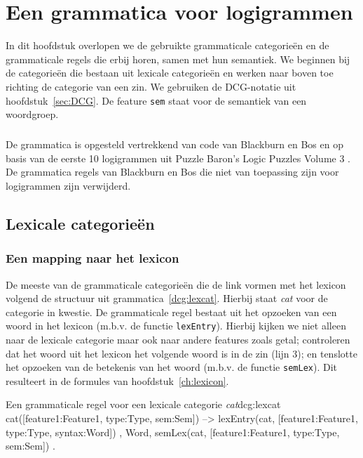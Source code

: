 \chapter{Een grammatica voor logigrammen}
\label{ch:grammatica}

In dit hoofdstuk overlopen we de gebruikte grammaticale categorieën en de grammaticale regels die erbij horen, samen met hun semantiek. We beginnen bij de categorieën die bestaan uit lexicale categorieën en werken naar boven toe richting de categorie van een zin. We gebruiken de DCG-notatie uit hoofdstuk~\ref{sec:DCG}. De feature \texttt{sem} staat voor de semantiek van een woordgroep.

\paragraph{}De grammatica is opgesteld vertrekkend van code van Blackburn en Bos \cite{Blackburn2006} en op basis van de eerste 10 logigrammen uit Puzzle Baron's Logic Puzzles Volume 3 \cite{logigrammen}. De grammatica regels van Blackburn en Bos die niet van toepassing zijn voor logigrammen zijn verwijderd.

\section{Lexicale categorieën}
\subsection{Een mapping naar het lexicon}
\label{sec:lexgram}
De meeste van de grammaticale categorieën die de link vormen met het lexicon volgend de structuur uit grammatica~\ref{dcg:lexcat}. Hierbij staat \textit{cat} voor de categorie in kwestie. De grammaticale regel bestaat uit het opzoeken van een woord in het lexicon (m.b.v. de functie \texttt{lexEntry}). Hierbij kijken we niet alleen naar de lexicale categorie maar ook naar andere features zoals getal; controleren dat het woord uit het lexicon het volgende woord is in de zin (lijn 3); en tenslotte het opzoeken van de betekenis van het woord (m.b.v. de functie \texttt{semLex}). Dit resulteert in de formules van hoofdstuk~\ref{ch:lexicon}.

\begin{dcg}{Een grammaticale regel voor een lexicale categorie \textit{cat}}{dcg:lexcat}
cat([feature1:Feature1, type:Type, sem:Sem]) -->
  { lexEntry(cat, [feature1:Feature1, type:Type, syntax:Word]) },
  Word,
  { semLex(cat, [feature1:Feature1, type:Type, sem:Sem]) }.
\end{dcg}

